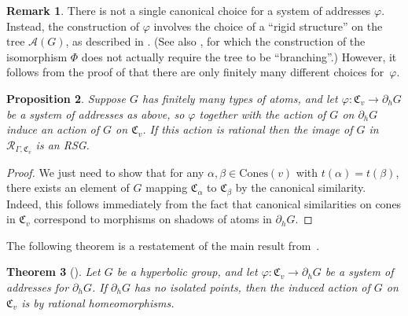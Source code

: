 \documentclass[11pt,letterpaper]{amsart}
\newtheorem{theorem}{Theorem}[section]
\newtheorem{proposition}[theorem]{Proposition}
\theoremstyle{definition}
\newtheorem{remark}[theorem]{Remark}
\newcommand{\R}{\mathcal{R}}
\newcommand{\C}{\mathfrak{C}}
\newcommand{\A}{\mathcal{A}}
\newcommand{\Cones}{\mathrm{Cones}}
\begin{document}
\begin{remark}
There is not a single canonical choice for a system of addresses $\varphi$.  Instead, the construction of $\varphi$ involves the choice of a ``rigid structure'' on the tree $\A(G)$, as described in \cite[Section~2.3]{BelkBleakMatucci}.  (See also \cite[Proposition~2.21]{BelkBleakMatucci}, for which the construction of the isomorphism $\Phi$ does not actually require the tree to be ``branching''.)  However, it follows from the proof of \cite[Proposition~2.18]{BelkBleakMatucci} that there are only finitely many different choices for~$\varphi$.
\end{remark}

\begin{proposition}\label{prop:hyp_similarities}
Suppose $G$ has finitely many types of atoms, and let $\varphi\colon \C_v\to \partial_h G$ be a system of addresses as above, so $\varphi$ together with the action of $G$ on $\partial_h G$ induce an action of $G$ on $\C_v$. If this action is rational then the image of $G$ in $\R_{\Gamma,\C_v}$ is an RSG.
\end{proposition}

\begin{proof}
We just need to show that for any $\alpha,\beta\in\Cones(v)$ with $t(\alpha)=t(\beta)$, there exists an element of $G$ mapping $\C_\alpha$ to $\C_\beta$ by the canonical similarity. Indeed, this follows immediately from the fact that canonical similarities on cones in $\C_v$ correspond to morphisms on shadows of atoms in $\partial_h G$.
\end{proof}

The following theorem is a restatement of the main result from~\cite{BelkBleakMatucci}.

\begin{theorem}[\cite{BelkBleakMatucci}]\label{thrm:BBM}
Let $G$ be a hyperbolic group, and let $\varphi\colon \C_v\to \partial_h G$ be a system of addresses for $\partial_h G$.  If $\partial_h G$ has no isolated points, then the induced action of $G$ on\/ $\C_v$ is by rational homeomorphisms.
\end{theorem}
\end{document}
